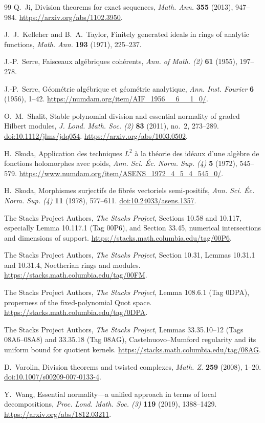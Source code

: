 \documentclass[11pt,reqno]{amsart}
\numberwithin{equation}{section}
\theoremstyle{definition}
\theoremstyle{remark}
\begin{document}
\begin{thebibliography}{99}
Q.~Ji, Division theorems for exact sequences, \emph{Math. Ann.}
\textbf{355} (2013), 947--984. \url{https://arxiv.org/abs/1102.3950}.

J.~J.~Kelleher and B.~A.~Taylor, Finitely generated ideals in rings of
analytic functions, \emph{Math. Ann.} \textbf{193} (1971), 225--237.

J.-P.~Serre, Faisceaux alg\'ebriques coh\'erents,
\emph{Ann. of Math. (2)} \textbf{61} (1955), 197--278.

J.-P.~Serre, G\'eom\'etrie alg\'ebrique et g\'eom\'etrie analytique,
\emph{Ann. Inst. Fourier} \textbf{6} (1956), 1--42.
\url{https://numdam.org/item/AIF_1956__6__1_0/}.

O.~M.~Shalit, Stable polynomial division and essential normality of
graded Hilbert modules, \emph{J. Lond. Math. Soc. (2)}
\textbf{83} (2011), no.~2, 273--289.
\href{https://doi.org/10.1112/jlms/jdq054}{doi:10.1112/jlms/jdq054}.
\url{https://arxiv.org/abs/1003.0502}.

H.~Skoda, Application des techniques $L^2$ \`a la th\'eorie des id\'eaux
d'une alg\`ebre de fonctions holomorphes avec poids,
\emph{Ann. Sci. \'Ec. Norm. Sup. (4)} \textbf{5} (1972), 545--579.
\url{https://www.numdam.org/item/ASENS_1972_4_5_4_545_0/}.

H.~Skoda, Morphismes surjectifs de fibr\'es vectoriels semi-positifs,
\emph{Ann. Sci. \'Ec. Norm. Sup. (4)} \textbf{11} (1978), 577--611.
\href{https://doi.org/10.24033/asens.1357}{doi:10.24033/asens.1357}.

The Stacks Project Authors, \emph{The Stacks Project},
Sections 10.58 and 10.117, especially Lemma 10.117.1 (Tag 00P6),
and Section 33.45, numerical intersections and dimensions of support.
\url{https://stacks.math.columbia.edu/tag/00P6}.

The Stacks Project Authors, \emph{The Stacks Project},
Section 10.31, Lemmas 10.31.1 and 10.31.4, Noetherian rings and modules.
\url{https://stacks.math.columbia.edu/tag/00FM}.

The Stacks Project Authors, \emph{The Stacks Project},
Lemma 108.6.1 (Tag 0DPA), properness of the fixed-polynomial Quot space.
\url{https://stacks.math.columbia.edu/tag/0DPA}.

The Stacks Project Authors, \emph{The Stacks Project},
Lemmas 33.35.10--12 (Tags 08A6--08A8) and 33.35.18 (Tag 08AG),
Castelnuovo--Mumford regularity and its uniform bound for quotient kernels.
\url{https://stacks.math.columbia.edu/tag/08AG}.

D.~Varolin, Division theorems and twisted complexes,
\emph{Math. Z.} \textbf{259} (2008), 1--20.
\href{https://doi.org/10.1007/s00209-007-0133-4}{doi:10.1007/s00209-007-0133-4}.

Y.~Wang, Essential normality---a unified approach in terms of local
decompositions, \emph{Proc. Lond. Math. Soc. (3)} \textbf{119} (2019),
1388--1429. \url{https://arxiv.org/abs/1812.03211}.

\end{thebibliography}
\end{document}
